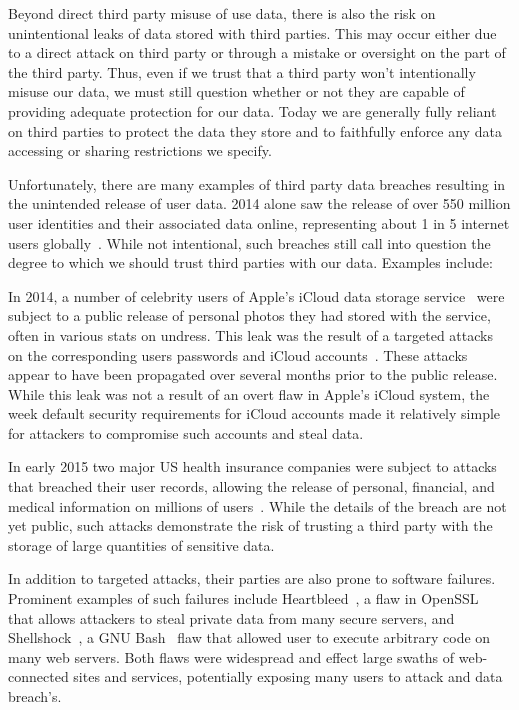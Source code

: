 Beyond direct third party misuse of use data, there is also the risk
on unintentional leaks of data stored with third parties. This may
occur either due to a direct attack on third party or through a
mistake or oversight on the part of the third party. Thus, even if we
trust that a third party won't intentionally misuse our data, we must
still question whether or not they are capable of providing adequate
protection for our data. Today we are generally fully reliant on third
parties to protect the data they store and to faithfully enforce any
data accessing or sharing restrictions we specify.

Unfortunately, there are many examples of third party data breaches
resulting in the unintended release of user data. 2014 alone saw the
release of over 550 million user identities and their associated data
online, representing about 1 in 5 internet users
globally~\cite{SymantecCorporation2014}. While not intentional, such
breaches still call into question the degree to which we should trust
third parties with our data. Examples include:

\begin{packed_desc}
\item[Apple iCloud Celebrity Photo Leak:] In 2014, a number of
  celebrity users of Apple's iCloud data storage
  service~\cite{apple-icloud} were subject to a public release of
  personal photos they had stored with the service, often in various
  stats on undress. This leak was the result of a targeted attacks on
  the corresponding users passwords and iCloud
  accounts~\cite{apple-icloudleak}. These attacks appear to have been
  propagated over several months prior to the public release. While
  this leak was not a result of an overt flaw in Apple's iCloud
  system, the week default security requirements for iCloud accounts
  made it relatively simple for attackers to compromise such accounts
  and steal data.
\item[Anthem and Premera Blue Cross Breaches:] In early 2015 two major
  US health insurance companies were subject to attacks that breached
  their user records, allowing the release of personal, financial, and
  medical information on millions of users~\cite{krebs-anthem,
    krebs-premera}. While the details of the breach are not yet
  public, such attacks demonstrate the risk of trusting a third party
  with the storage of large quantities of sensitive data.
\item[Heartbleed, Shellshock, Etc:] In addition to targeted attacks,
  their parties are also prone to software failures. Prominent
  examples of such failures include Heartbleed~\cite{heartbleed}, a
  flaw in OpenSSL~\cite{openssl} that allows attackers to steal
  private data from many secure servers, and
  Shellshock~\cite{symantec-shellshock}, a GNU Bash~\cite{gnu-bash}
  flaw that allowed user to execute arbitrary code on many web
  servers. Both flaws were widespread and effect large swaths of
  web-connected sites and services, potentially exposing many users to
  attack and data breach's.
\end{packed_desc}

